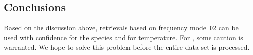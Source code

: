 \subsection{Conclusions}
\label{sec:fm02:conclusions}
Based on the discussion above, retrievals based on frequency mode~02 can be
used with confidence for the species  and for temperature. For
, some caution is warranted.  We hope to solve this problem before
the entire data set is processed.
